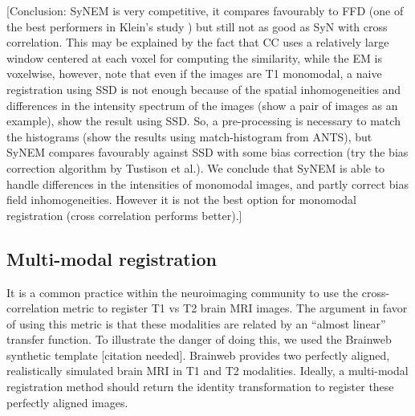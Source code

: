 \documentclass[11pt]{article}
\begin{document}
[Conclusion: SyNEM is very competitive, it compares favourably to FFD (one of the best performers in Klein's study \cite{Klein2009}) but still not as good as SyN with cross correlation. This may be explained by the fact that CC uses a relatively large window centered at each voxel for computing the similarity, while the EM is voxelwise, however, note that even if the images are T1 monomodal, a naive registration using SSD is not enough because of the spatial inhomogeneities and differences in the intensity spectrum of the images (show a pair of images as an example), show the result using SSD. So, a pre-processing is necessary to match the histograms (show the results using match-histogram from ANTS), but SyNEM compares favourably against SSD with some bias correction (try the bias correction algorithm by Tustison et al.). We conclude that SyNEM is able to handle differences in the intensities of monomodal images, and partly correct bias field inhomogeneities. However it is not the best option for monomodal registration (cross correlation performs better).]

\subsection{Multi-modal registration}
It is a common practice within the neuroimaging community to use the cross-correlation metric to register T1 vs T2 brain MRI images. The argument in favor of using
this metric is that these modalities are related by an ``almost linear'' transfer function. To illustrate the danger of doing this, we used the Brainweb synthetic
template [citation needed]. Brainweb provides two perfectly aligned, realistically simulated brain MRI in T1 and T2 modalities. Ideally, a multi-modal registration method
should return the identity transformation to register these perfectly aligned images.
\end{document}
